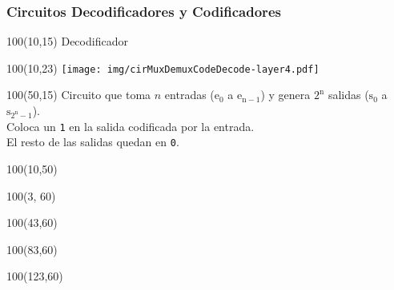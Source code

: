 \documentclass[aspectratio=169]{beamer}
\begin{document}
\begin{frame}[fragile]
    \frametitle{Circuitos Decodificadores y Codificadores}
    \begin{textblock}{100}(10,15) Decodificador \end{textblock}
    \begin{textblock}{100}(10,23) \texttt{[image: img/cirMuxDemuxCodeDecode-layer4.pdf]} \end{textblock}
    \begin{textblock}{100}(50,15)
    \small Circuito que toma $n$ entradas ($\mathrm{e_0}$ a $\mathrm{e_{n-1}}$) y genera $\mathrm{2^n}$ salidas ($\mathrm{s_0}$ a $\mathrm{s_{2^n-1}}$).\\
    \bigskip
    Coloca un \texttt{1} en la salida codificada por la entrada.\\ El resto de las salidas quedan en \texttt{0}.
    \end{textblock}
    \begin{textblock}{100}(10,50)   \end{textblock}
    \begin{textblock}{100}(3, 60)   \end{textblock}
    \begin{textblock}{100}(43,60)   \end{textblock}
    \begin{textblock}{100}(83,60)   \end{textblock}
    \begin{textblock}{100}(123,60)  \end{textblock}
\end{frame}
\end{document}
